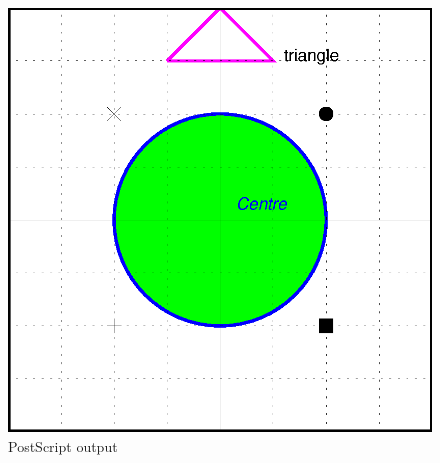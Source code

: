 \begin{figure}[h]
\begin{center}
\includegraphics{PS_Stream/exemple.ps}
\end{center}
\caption{PostScript output}
\end{figure}


